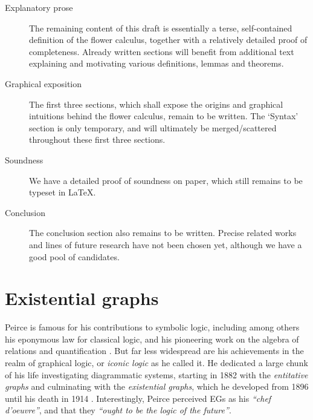 \begin{description}
  \item[Explanatory prose] The remaining content of this draft is essentially a
  terse, self-contained definition of the flower calculus, together with a
  relatively detailed proof of completeness. Already written sections will
  benefit from additional text explaining and motivating various definitions,
  lemmas and theorems.
  
  \item[Graphical exposition] The first three sections, which shall expose the
  origins and graphical intuitions behind the flower calculus, remain to be
  written. The `Syntax' section is only temporary, and will ultimately be
  merged/scattered throughout these first three sections.

  \item[Soundness] We have a detailed proof of soundness on paper, which still
  remains to be typeset in \LaTeX.
  
  \item[Conclusion] The conclusion section also remains to be written. Precise
  related works and lines of future research have not been chosen yet, although
  we have a good pool of candidates.
\end{description}



\section{Existential graphs}


Peirce is famous for his contributions to symbolic logic, including among others
his eponymous law for classical logic, and his pioneering work on the algebra of
relations and quantification . But far less
widespread are his achievements in the realm of graphical logic, or \emph{iconic
logic} as he called it. He dedicated a large chunk of his life investigating
diagrammatic systems, starting in 1882 with the \emph{entitative graphs} and
culminating with the \emph{existential graphs}, which he developed from 1896
until his death in 1914 . Interestingly, Peirce perceived
EGs as his \textit{``chef d'oeuvre''}, and that they \textit{``ought to be the
logic of the future''}.

